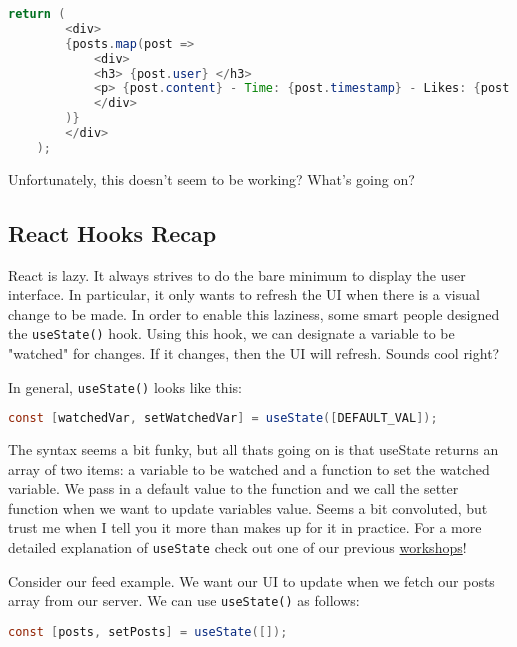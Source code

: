 \begin{lstlisting}[language=Java]
    return (
        <div>
        {posts.map(post => 
            <div>
            <h3> {post.user} </h3>
            <p> {post.content} - Time: {post.timestamp} - Likes: {post.num_likes}</p>
            </div>        
        )}
        </div>
    );
\end{lstlisting}

Unfortunately, this doesn't seem to be working? What's going on?

\subsection*{React Hooks Recap}

React is lazy. It always strives to do the bare minimum to display the user interface. In particular, it only wants to refresh the UI when there is a visual change to be made. In order to enable this laziness, some smart people designed the \texttt{useState()} hook. Using this hook, we can designate a variable to be "watched" for changes. If it changes, then the UI will refresh. Sounds cool right?

In general, \texttt{useState()} looks like this:

\begin{lstlisting}[language=Java]
    const [watchedVar, setWatchedVar] = useState([DEFAULT_VAL]);
\end{lstlisting}

The syntax seems a bit funky, but all thats going on is that useState returns an array of two items: a variable to be watched and a function to set the watched variable. We pass in a default value to the function and we call the setter function when we want to update variables value. Seems a bit convoluted, but trust me when I tell you it more than makes up for it in practice. For a more detailed explanation of \texttt{useState} check out one of our previous \href{https://www.youtube.com/watch?v=ehgl3HpR5xQ}{workshops}!

Consider our feed example. We want our UI to update when we fetch our posts array from our server. We can use \texttt{useState()} as follows:

\begin{lstlisting}[language=Java]
    const [posts, setPosts] = useState([]);
\end{lstlisting}


